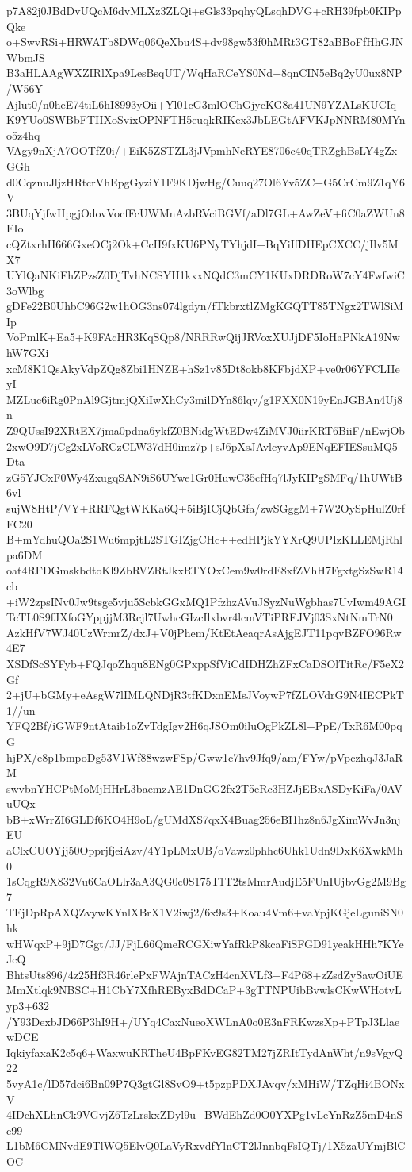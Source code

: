 p7A82j0JBdDvUQcM6dvMLXz3ZLQi+sGls33pqhyQLsqhDVG+cRH39fpb0KIPpQke
o+SwvRSi+HRWATb8DWq06QeXbu4S+dv98gw53f0hMRt3GT82aBBoFfHhGJNWbmJS
B3aHLAAgWXZIRlXpa9LesBsqUT/WqHaRCeYS0Nd+8qnCIN5eBq2yU0ux8NP/W56Y
Ajlut0/n0heE74tiL6hI8993yOii+Yl01cG3mlOChGjycKG8a41UN9YZALsKUCIq
K9YUo0SWBbFTIIXoSvixOPNFTH5euqkRIKex3JbLEGtAFVKJpNNRM80MYno5z4hq
VAgy9nXjA7OOTfZ0i/+EiK5ZSTZL3jJVpmhNeRYE8706c40qTRZghBsLY4gZxGGh
d0CqznuJljzHRtcrVhEpgGyziY1F9KDjwHg/Cuuq27Ol6Yv5ZC+G5CrCm9Z1qY6V
3BUqYjfwHpgjOdovVocfFcUWMnAzbRVciBGVf/aDl7GL+AwZeV+fiC0aZWUn8EIo
cQZtxrhH666GxeOCj2Ok+CcII9fxKU6PNyTYhjdI+BqYiIfDHEpCXCC/jIlv5MX7
UYlQaNKiFhZPzsZ0DjTvhNCSYH1kxxNQdC3mCY1KUxDRDRoW7cY4FwfwiC3oWlbg
gDFe22B0UhbC96G2w1hOG3ns074lgdyn/fTkbrxtlZMgKGQTT85TNgx2TWlSiMIp
VoPmlK+Ea5+K9FAcHR3KqSQp8/NRRRwQijJRVoxXUJjDF5IoHaPNkA19NwhW7GXi
xcM8K1QsAkyVdpZQg8Zbi1HNZE+hSz1v85Dt8okb8KFbjdXP+ve0r06YFCLIIeyI
MZLuc6iRg0PnAl9GjtmjQXiIwXhCy3milDYn86lqv/g1FXX0N19yEnJGBAn4Uj8n
Z9QUssI92XRtEX7jma0pdna6ykfZ0BNidgWtEDw4ZiMVJ0iirKRT6BiiF/nEwjOb
2xwO9D7jCg2xLVoRCzCLW37dH0imz7p+sJ6pXsJAvlcyvAp9ENqEFIESsuMQ5Dta
zG5YJCxF0Wy4ZxugqSAN9iS6UYwe1Gr0HuwC35cfHq7lJyKIPgSMFq/1hUWtB6vl
sujW8HtP/VY+RRFQgtWKKa6Q+5iBjICjQbGfa/zwSGggM+7W2OySpHulZ0rfFC20
B+mYdhuQOa2S1Wu6mpjtL2STGIZjgCHc++edHPjkYYXrQ9UPIzKLLEMjRhlpa6DM
oat4RFDGmskbdtoKl9ZbRVZRtJkxRTYOxCem9w0rdE8xfZVhH7FgxtgSzSwR14cb
+iW2zpsINv0Jw9tsge5vju5ScbkGGxMQ1PfzhzAVuJSyzNuWgbhas7UvIwm49AGI
TcTL0S9fJXfoGYppjjM3Rcjl7UwhcGIzcIlxbvr4lcmVTiPREJVj03SxNtNmTrN0
AzkHfV7WJ40UzWrmrZ/dxJ+V0jPhem/KtEtAeaqrAsAjgEJT11pqvBZFO96Rw4E7
XSDfScSYFyb+FQJqoZhqu8ENg0GPxppSfViCdIDHZhZFxCaDSOlTitRc/F5eX2Gf
2+jU+bGMy+eAsgW7lIMLQNDjR3tfKDxnEMsJVoywP7fZLOVdrG9N4IECPkT1//un
YFQ2Bf/iGWF9ntAtaib1oZvTdgIgv2H6qJSOm0iluOgPkZL8l+PpE/TxR6M00pqG
hjPX/e8p1bmpoDg53V1Wf88wzwFSp/Gww1c7hv9Jfq9/am/FYw/pVpczhqJ3JaRM
swvbnYHCPtMoMjHHrL3baemzAE1DnGG2fx2T5eRc3HZJjEBxASDyKiFa/0AVuUQx
bB+xWrrZI6GLDf6KO4H9oL/gUMdXS7qxX4Buag256eBI1hz8n6JgXimWvJn3njEU
aClxCUOYjj50OpprjfjeiAzv/4Y1pLMxUB/oVawz0phhc6Uhk1Udn9DxK6XwkMh0
1sCqgR9X832Vu6CaOLlr3aA3QG0c0S175T1T2tsMmrAudjE5FUnIUjbvGg2M9Bg7
TFjDpRpAXQZvywKYnlXBrX1V2iwj2/6x9s3+Koau4Vm6+vaYpjKGjeLguniSN0hk
wHWqxP+9jD7Ggt/JJ/FjL66QmeRCGXiwYafRkP8kcaFiSFGD91yeakHHh7KYeJcQ
BhtsUts896/4z25Hf3R46rlePxFWAjnTACzH4cnXVLf3+F4P68+zZsdZySawOiUE
MmXtlqk9NBSC+H1CbY7XfhREByxBdDCaP+3gTTNPUibBvwlsCKwWHotvLyp3+632
/Y93DexbJD66P3hI9H+/UYq4CaxNueoXWLnA0o0E3nFRKwzsXp+PTpJ3LlaewDCE
IqkiyfaxaK2c5q6+WaxwuKRTheU4BpFKvEG82TM27jZRItTydAnWht/n9sVgyQ22
5vyA1c/lD57dci6Bn09P7Q3gtGl8SvO9+t5pzpPDXJAvqv/xMHiW/TZqHi4BONxV
4IDchXLhnCk9VGvjZ6TzLrskxZDyl9u+BWdEhZd0O0YXPg1vLeYnRzZ5mD4nSc99
L1bM6CMNvdE9TlWQ5ElvQ0LaVyRxvdfYlnCT2lJnnbqFsIQTj/1X5zaUYmjBlCOC
